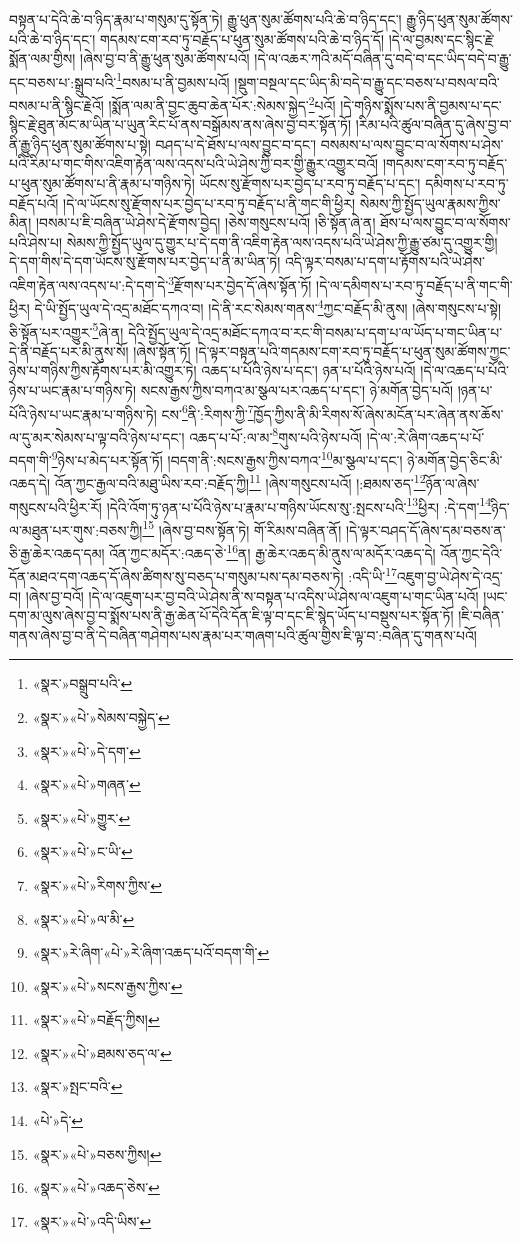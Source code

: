 བསྟན་པ་དེའི་ཆེ་བ་ཉིད་རྣམ་པ་གསུམ་དུ་སྟོན་ཏེ། རྒྱུ་ཕུན་སུམ་ཚོགས་པའི་ཆེ་བ་ཉིད་དང་། རྒྱུ་ཉིད་ཕུན་སུམ་ཚོགས་པའི་ཆེ་བ་ཉིད་དང་། གདམས་ངག་རབ་ཏུ་བརྗོད་པ་ཕུན་སུམ་ཚོགས་པའི་ཆེ་བ་ཉིད་དོ། །དེ་ལ་བྱམས་དང་སྙིང་རྗེ་སྨོན་ལམ་གྱིས། །ཞེས་བྱ་བ་ནི་རྒྱུ་ཕུན་སུམ་ཚོགས་པའོ། །དེ་ལ་འཆར་ཀའི་མདོ་བཞིན་དུ་བདེ་བ་དང་ཡིད་བདེ་བ་རྒྱུ་དང་བཅས་པ་:སྒྲུབ་པའི་\footnote{«སྣར་»བསྒྲུབ་པའི་}བསམ་པ་ནི་བྱམས་པའོ། །སྡུག་བསྔལ་དང་ཡིད་མི་བདེ་བ་རྒྱུ་དང་བཅས་པ་བསལ་བའི་བསམ་པ་ནི་སྙིང་རྗེའོ། །སྨོན་ལམ་ནི་བྱང་ཆུབ་ཆེན་པོར་:སེམས་སྐྱེད་\footnote{«སྣར་»«པེ་»སེམས་བསྐྱེད་}པའོ། །དེ་གཉིས་སྨོས་པས་ནི་བྱམས་པ་དང་སྙིང་རྗེ་ཐུན་མོང་མ་ཡིན་པ་ཡུན་རིང་པོ་ནས་བསྒོམས་ནས་ཞེས་བྱ་བར་སྟོན་ཏོ། །རིམ་པའི་ཚུལ་བཞིན་དུ་ཞེས་བྱ་བ་ནི་རྒྱུ་ཉིད་ཕུན་སུམ་ཚོགས་པ་སྟེ། བཤད་པ་དེ་ཐོས་པ་ལས་བྱུང་བ་དང་། བསམས་པ་ལས་བྱུང་བ་ལ་སོགས་པ་ཤེས་པའི་རིམ་པ་གང་གིས་འཇིག་རྟེན་ལས་འདས་པའི་ཡེ་ཤེས་ཀྱི་བར་གྱི་རྒྱུར་འགྱུར་བའོ། །གདམས་ངག་རབ་ཏུ་བརྗོད་པ་ཕུན་སུམ་ཚོགས་པ་ནི་རྣམ་པ་གཉིས་ཏེ། ཡོངས་སུ་རྫོགས་པར་བྱེད་པ་རབ་ཏུ་བརྗོད་པ་དང་། དམིགས་པ་རབ་ཏུ་བརྗོད་པའོ། །དེ་ལ་ཡོངས་སུ་རྫོགས་པར་བྱེད་པ་རབ་ཏུ་བརྗོད་པ་ནི་གང་གི་ཕྱིར། སེམས་ཀྱི་སྤྱོད་ཡུལ་རྣམས་ཀྱིས་མིན། །བསམ་པ་ཇི་བཞིན་ཡེ་ཤེས་དེ་རྫོགས་བྱེད། །ཅེས་གསུངས་པའོ། །ཅི་སྟོན་ཞེ་ན། ཐོས་པ་ལས་བྱུང་བ་ལ་སོགས་པའི་ཤེས་པ། སེམས་ཀྱི་སྤྱོད་ཡུལ་དུ་གྱུར་པ་དེ་དག་ནི་འཇིག་རྟེན་ལས་འདས་པའི་ཡེ་ཤེས་ཀྱི་རྒྱུ་ཙམ་དུ་འགྱུར་གྱི། དེ་དག་གིས་དེ་དག་ཡོངས་སུ་རྫོགས་པར་བྱེད་པ་ནི་མ་ཡིན་ཏེ། འདི་ལྟར་བསམ་པ་དག་པ་རྟོགས་པའི་ཡེ་ཤེས་འཇིག་རྟེན་ལས་འདས་པ་:དེ་དག་དེ་\footnote{«སྣར་»«པེ་»དེ་དག་}རྫོགས་པར་བྱེད་དོ་ཞེས་སྟོན་ཏོ། །དེ་ལ་དམིགས་པ་རབ་ཏུ་བརྗོད་པ་ནི་གང་གི་ཕྱིར། དེ་ཡི་སྤྱོད་ཡུལ་དེ་འདྲ་མཐོང་དཀའ་བ། །དེ་ནི་རང་སེམས་གནས་\footnote{«སྣར་»«པེ་»གཞན་}ཀྱང་བརྗོད་མི་ནུས། །ཞེས་གསུངས་པ་སྟེ། ཅི་སྟོན་པར་འགྱུར་\footnote{«སྣར་»«པེ་»གྱུར་}ཞེ་ན། དེའི་སྤྱོད་ཡུལ་དེ་འདྲ་མཐོང་དཀའ་བ་རང་གི་བསམ་པ་དག་པ་ལ་ཡོད་པ་གང་ཡིན་པ་དེ་ནི་བརྗོད་པར་མི་ནུས་སོ། །ཞེས་སྟོན་ཏོ། །དེ་ལྟར་བསྟན་པའི་གདམས་ངག་རབ་ཏུ་བརྗོད་པ་ཕུན་སུམ་ཚོགས་ཀྱང་ཉེས་པ་གཉིས་ཀྱིས་རྟོགས་པར་མི་འགྱུར་ཏེ། འཆད་པ་པོའི་ཉེས་པ་དང་། ཉན་པ་པོའི་ཉེས་པའོ། །དེ་ལ་འཆད་པ་པོའི་ཉེས་པ་ཡང་རྣམ་པ་གཉིས་ཏེ། སངས་རྒྱས་ཀྱིས་བཀའ་མ་སྩལ་པར་འཆད་པ་དང་། ཉེ་མགོན་བྱེད་པའོ། །ཉན་པ་པོའི་ཉེས་པ་ཡང་རྣམ་པ་གཉིས་ཏེ། ངས་\footnote{«སྣར་»«པེ་»ང་ཡི་}ནི་:རིགས་ཀྱི་\footnote{«སྣར་»«པེ་»རིགས་ཀྱིས་}ཁྱོད་ཀྱིས་ནི་མི་རིགས་སོ་ཞེས་མངོན་པར་ཞེན་ནས་ཆོས་ལ་དུ་མར་སེམས་པ་ལྟ་བའི་ཉེས་པ་དང་། འཆད་པ་པོ་:ལ་མ་\footnote{«སྣར་»«པེ་»ལ་མི་}གུས་པའི་ཉེས་པའོ། །དེ་ལ་:རེ་ཞིག་འཆད་པ་པོ་བདག་གི་\footnote{«སྣར་»རེ་ཞིག་«པེ་»རེ་ཞིག་འཆད་པའོ་བདག་གི་}ཉེས་པ་མེད་པར་སྟོན་ཏོ། །བདག་ནི་:སངས་རྒྱས་ཀྱིས་བཀའ་\footnote{«སྣར་»«པེ་»སངས་རྒྱས་ཀྱིས་}མ་སྩལ་པ་དང་། ཉེ་མགོན་བྱེད་ཅིང་མི་འཆད་དེ། འོན་ཀྱང་རྒྱལ་བའི་མཐུ་ཡིས་རབ་:བརྗོད་ཀྱི།\footnote{«སྣར་»«པེ་»བརྗོད་ཀྱིས།} །ཞེས་གསུངས་པའོ། །:ཐམས་ཅད་\footnote{«སྣར་»«པེ་»ཐམས་ཅད་ལ་}ཉོན་ལ་ཞེས་གསུངས་པའི་ཕྱིར་རོ། །དེའི་འོག་ཏུ་ཉན་པ་པོའི་ཉེས་པ་རྣམ་པ་གཉིས་ཡོངས་སུ་:སྤངས་པའི་\footnote{«སྣར་»སྤང་བའི་}ཕྱིར། :དེ་དག་\footnote{«པེ་»དེ་}ཉིད་ལ་མཐུན་པར་གུས་:བཅས་ཀྱི།\footnote{«སྣར་»«པེ་»བཅས་ཀྱིས།} །ཞེས་བྱ་བས་སྟོན་ཏེ། གོ་རིམས་བཞིན་ནོ། །དེ་ལྟར་བཤད་དོ་ཞེས་དམ་བཅས་ན་ཅི་རྒྱ་ཆེར་འཆད་དམ། འོན་ཀྱང་མདོར་:འཆད་ཅེ་\footnote{«སྣར་»«པེ་»འཆད་ཅེས་}ན། རྒྱ་ཆེར་འཆད་མི་ནུས་ལ་མདོར་འཆད་དེ། འོན་ཀྱང་དེའི་དོན་མཐའ་དག་འཆད་དོ་ཞེས་ཚིགས་སུ་བཅད་པ་གསུམ་པས་དམ་བཅས་ཏེ། :འདི་ཡི་\footnote{«སྣར་»«པེ་»འདི་ཡིས་}འཇུག་བྱ་ཡེ་ཤེས་དེ་འདྲ་བ། །ཞེས་བྱ་བའོ། །དེ་ལ་འཇུག་པར་བྱ་བའི་ཡེ་ཤེས་ནི་ས་བསྟན་པ་འདིས་ཡེ་ཤེས་ལ་འཇུག་པ་གང་ཡིན་པའོ། །ཡང་དག་མ་ལུས་ཞེས་བྱ་བ་སྨོས་པས་ནི་རྒྱ་ཆེན་པོ་དེའི་དོན་ཇི་ལྟ་བ་དང་ཇི་སྙེད་ཡོད་པ་བསྡུས་པར་སྟོན་ཏོ། །ཇི་བཞིན་གནས་ཞེས་བྱ་བ་ནི་དེ་བཞིན་གཤེགས་པས་རྣམ་པར་གཞག་པའི་ཚུལ་གྱིས་ཇི་ལྟ་བ་:བཞིན་དུ་གནས་པའོ། 